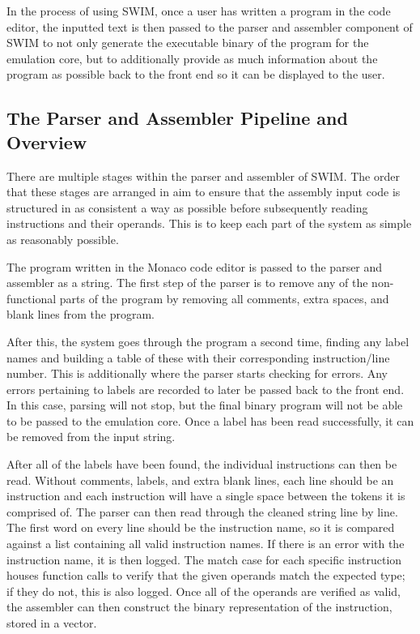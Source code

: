 \documentclass[
    parskip=half,
    fontsize=12pt,
    titlepage=firstiscover,
    toc=bibliography,
    numbers=endperiod
]{scrartcl}
\begin{document}
In the process of using SWIM, once a user has written a program in the
code editor, the inputted text is then passed to the parser and
assembler component of SWIM to not only generate the executable binary
of the program for the emulation core, but to additionally provide as
much information about the program as possible back to the front end so
it can be displayed to the user.

\subsection{The Parser and Assembler Pipeline and Overview}

There are multiple stages within the parser and assembler of SWIM. The
order that these stages are arranged in aim to ensure that the assembly
input code is structured in as consistent a way as possible before
subsequently reading instructions and their operands. This is to keep
each part of the system as simple as reasonably possible.

The program written in the Monaco code editor is passed to the parser
and assembler as a string. The first step of the parser is to remove any
of the non-functional parts of the program by removing all comments,
extra spaces, and blank lines from the program.

After this, the system goes through the program a second time, finding
any label names and building a table of these with their corresponding
instruction/line number. This is additionally where the parser starts
checking for errors. Any errors pertaining to labels are recorded to
later be passed back to the front end. In this case, parsing will not
stop, but the final binary program will not be able to be passed to the
emulation core. Once a label has been read successfully, it can be
removed from the input string.

After all of the labels have been found, the individual instructions can
then be read. Without comments, labels, and extra blank lines, each line
should be an instruction and each instruction will have a single space
between the tokens it is comprised of. The parser can then read through
the cleaned string line by line. The first word on every line should be
the instruction name, so it is compared against a list containing all
valid instruction names. If there is an error with the instruction name,
it is then logged. The match case for each specific instruction houses
function calls to verify that the given operands match the expected
type; if they do not, this is also logged. Once all of the operands are
verified as valid, the assembler can then construct the binary
representation of the instruction, stored in a vector.
\end{document}
